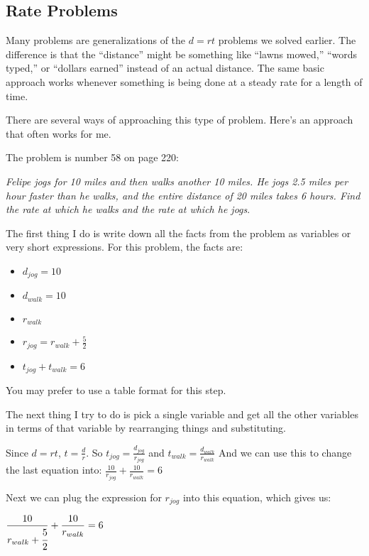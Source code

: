 \documentclass[fleqn,addpoints]{exam}
\begin{document}
\subsection{Rate Problems}

Many problems are generalizations of the $d = rt$ problems we solved earlier.  The difference is that the ``distance''
might be something like ``lawns mowed,'' ``words typed,'' or ``dollars earned'' instead of an actual distance.  The same
basic approach works whenever something is being done at a steady rate for a length of time.

There are several ways of approaching this type of problem.  Here's an approach that often works for me.

The problem is number 58 on page 220: 

{\em Felipe jogs for 10 miles and then walks another 10 miles.  He jogs 2.5 miles per
hour faster than he walks, and the entire distance of 20 miles takes 6 hours.  Find the rate at which he walks and the
rate at which he jogs}.

The first thing I do is write down all the facts from the problem as variables or very short expressions.  For this
problem, the facts are:

\begin{itemize}
  \item $d_{jog} = 10$
  \item $d_{walk} = 10$
  \item $r_{walk}$
  \item $\displaystyle r_{jog} = r_{walk} + \frac{5}{2}$  
  \item $t_{jog} + t_{walk} = 6$
\end{itemize}

You may prefer to use a table format for this step.

The next thing I try to do is pick a single variable and get all the other variables in terms of that variable by
rearranging things and substituting.

Since $d = rt$, $\displaystyle t = \frac{d}{r}$.  So $\displaystyle t_{jog} = \frac{d_{jog}}{r_{jog}}$ 
and $ \displaystyle t_{walk} = \frac{d_{walk}}{r_{walk}}$ 
And we can use this to change the last equation into: $\displaystyle \frac{10}{r_{jog}} + \frac{10}{r_{walk}} = 6$

Next we can plug the expression for $r_{jog}$ into this equation, which gives us:

\( \displaystyle \frac{10}{r_{walk} + \cfrac{5}{2}} + \frac{10}{r_{walk}} = 6 \)
\end{document}

